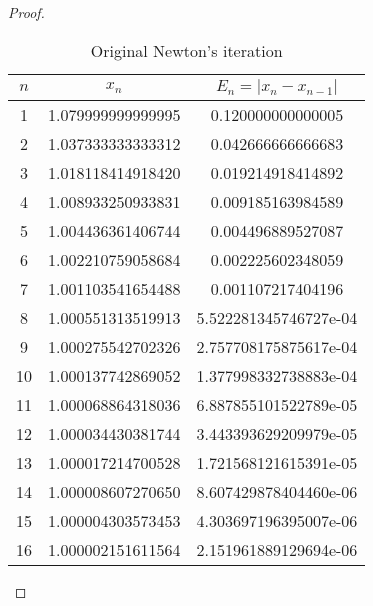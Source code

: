 \begin{enumerate}
\begin{proof}
	\begin{table}[htbp]
		\begin{subtable}[t]{.49\linewidth}
			\centering
			\caption{Original Newton's iteration}
			\begin{tabular}[t]{|c|c|c|}
			\hline
			$n$	&	\(x_n\)				&	\(E_n=|x_n-x_{n-1}|\)	\\	\hline
			\footnotesize	1	&	\footnotesize	1.079999999999995	&	\footnotesize	0.120000000000005	\\	\hline
			\footnotesize	2	&	\footnotesize	1.037333333333312	&	\footnotesize	0.042666666666683	\\	\hline
			\footnotesize	3	&	\footnotesize	1.018118414918420	&	\footnotesize	0.019214918414892	\\	\hline
			\footnotesize	4	&	\footnotesize	1.008933250933831	&	\footnotesize	0.009185163984589	\\	\hline
			\footnotesize	5	&	\footnotesize	1.004436361406744	&	\footnotesize	0.004496889527087	\\	\hline
			\footnotesize	6	&	\footnotesize	1.002210759058684	&	\footnotesize	0.002225602348059	\\	\hline
			\footnotesize	7	&	\footnotesize	1.001103541654488	&	\footnotesize	0.001107217404196	\\	\hline
			\footnotesize	8	&	\footnotesize	1.000551313519913	&	\footnotesize	5.522281345746727e-04	\\	\hline
			\footnotesize	9	&	\footnotesize	1.000275542702326	&	\footnotesize	2.757708175875617e-04	\\	\hline
			\footnotesize	10	&	\footnotesize	1.000137742869052	&	\footnotesize	1.377998332738883e-04	\\	\hline
			\footnotesize	11	&	\footnotesize	1.000068864318036	&	\footnotesize	6.887855101522789e-05	\\	\hline
			\footnotesize	12	&	\footnotesize	1.000034430381744	&	\footnotesize	3.443393629209979e-05	\\	\hline
			\footnotesize	13	&	\footnotesize	1.000017214700528	&	\footnotesize	1.721568121615391e-05	\\	\hline
			\footnotesize	14	&	\footnotesize	1.000008607270650	&	\footnotesize	8.607429878404460e-06	\\	\hline
			\footnotesize	15	&	\footnotesize	1.000004303573453	&	\footnotesize	4.303697196395007e-06	\\	\hline
			\footnotesize	16	&	\footnotesize	1.000002151611564	&	\footnotesize	2.151961889129694e-06	\\	\hline

\end{tabular}
\end{subtable}
\end{table}
\end{proof}
\end{enumerate}
